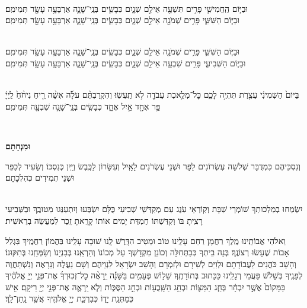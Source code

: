 \documentclass[twoside, openany, parskip=half, 11pt]{book}
\begin{document}
 \\
וּבַיּ֧וֹם הַֽחֲמִישִׁ֛י פָּרִ֥ים תִּשְׁעָ֖ה אֵילִ֣ם שְׁנָ֑יִם כְּבָשִׂ֧ים בְּנֵֽי־שָׁנָ֛ה אַרְבָּעָ֥ה עָשָׂ֖ר תְּמִימִֽם׃
\\
וּבַיּ֧וֹם הַשִּׁשִּׁ֛י פָּרִ֥ים שְׁמֹנָ֖ה אֵילִ֣ם שְׁנָ֑יִם כְּבָשִׂ֧ים בְּנֵֽי־שָׁנָ֛ה אַרְבָּעָ֥ה עָשָׂ֖ר תְּמִימִֽם׃



 \\
וּבַיּ֧וֹם הַשִּׁשִּׁ֛י פָּרִ֥ים שְׁמֹנָ֖ה אֵילִ֣ם שְׁנָ֑יִם כְּבָשִׂ֧ים בְּנֵֽי־שָׁנָ֛ה אַרְבָּעָ֥ה עָשָׂ֖ר תְּמִימִֽם׃
\\
וּבַיּ֧וֹם הַשְּׁבִיעִ֛י פָּרִ֥ים שִׁבְעָ֖ה אֵילִ֣ם שְׁנָ֑יִם כְּבָשִׂ֧ים בְּנֵֽי־שָׁנָ֛ה אַרְבָּעָ֥ה עָשָׂ֖ר תְּמִימִֽם׃



\\
בַּיּוֹם֙ הַשְּׁמִינִ֔י עֲצֶ֖רֶת תִּהְיֶ֣ה לָכֶ֑ם כׇּל־מְלֶ֥אכֶת עֲבֹדָ֖ה לֹ֥א תַֽעֲשֽׂוּ׃ וְהִקְרַבְתֶּ֨ם עֹלָ֜ה אִשֵּׁ֨ה רֵ֤יחַ נִיחֹ֨חַ֙ לַֽיְיָ֔ פַּ֥ר אֶחָ֖ד אַ֣יִל אֶחָ֑ד כְּבָשִׂ֧ים בְּנֵֽי־שָׁנָ֛ה שִׁבְעָ֖ה תְּמִימִֽם׃

\\ \label{uminchasam}
\begin{Large}\textbf{וּמִנְחָתָם}\end{Large}
וְנִסְכֵּיהֶם כִּמְדֻבָּר שְׁלֹשָׁה עֶשְׂרוֹנִים לַפָּר וּשְׁנֵי עֶשְׂרֹנִים לָאָֽיִל וְעִשָּׂרוֹן לַכֶּֽבֶשׂ וְיַֽיִן כְּנִסְכּוֹ׃ וְשָׂעִיר לְכַפֵּר וּשְׁנֵי תְמִידִים כְּהִלְכָתָם׃

\begin{sometimes}

\shabbos\\
יִשְׂמְחוּ בְמַלְכוּתְךָ שׁוֹמְרֵי שַׁבָּת וְקֽוֹרְאֵי עֹֽנֶג עַם מְקַדְּשֵׁי שְׁבִיעִי כֻּלָּם יִשְׂבְּעוּ וְיִתְעַנְּגוּ מִטּוּבֶֽךָ וּבַשְּׁבִיעִי רָצִֽיתָ בּוֹ וְקִדַּשְׁתּוֹ חֶמְדַּת יָמִים אוֹתוֹ קָרָֽאתָ זֵֽכֶר לְמַעֲשֵׂה בְרֵאשִׁית׃

\end{sometimes}

\enlargethispage{\baselineskip}
וֵאלֹהֵי אֲבוֹתֵֽינוּ מֶֽלֶךְ רַחֲמָן רַחֵם עָלֵֽינוּ טוֹב וּמֵטִיב הִדָּֽרֶשׁ לָֽנוּ שׁוּבָה עָלֵֽינוּ בַּהֲמוֹן רַחֲמֶֽיךָ בִּגְלַל אָבוֹת שֶׁעָשׂוּ רְצוֹנֶֽךָ׃ בְּנֵה בֵיתְךָ כְּבַתְּחִלָּה וְכוֹנֵן מִקְדָשְׁךָ עַל מְכוֹנוֹ וְהַרְאֵֽנוּ בְּבִנְיָנוֹ וְשַׂמְּחֵֽנוּ בְּתִקּוּנוֹ׃ וְהָשֵׁב כֹּהֲנִים לַעֲבוֹדָתָם וּלְוִיִּם לְשִׁירָם וּלְזִמְרָם וְהָשֵׁב יִשְׂרָאֵל לִנְוֵיהֶם׃ וְשָׁם נַעֲלֶה וְנֵרָאֶה וְנִשְׁתַּחֲוֶה לְפָנֶֽיךָ בְּשָׁלֹֹשׁ פַּעֲמֵי רְגָלֵֽינוּ כַּכָּתוּב בְּתוֹרָתֶֽךָ׃ שָׁל֣וֹשׁ פְּעָמִ֣ים בַּשָּׁנָ֡ה יֵֽרָאֶ֨ה כׇל־זְכֽוּרְךָ֜ אֶת־פְּנֵ֣י יְיָ֣ אֱלֹהֶ֗יךָ בַּמָּקוֹם֙ אֲשֶׁ֣ר יִבְחָ֔ר בְּחַ֧ג הַמַּצּ֛וֹת וּבְחַ֥ג הַשָּֽׁבֻע֖וֹת וּבְחַ֣ג הַסֻּכּ֑וֹת וְלֹ֧א יֵֽרָאֶ֛ה אֶת־פְּנֵ֥י יְיָ֖ רֵיקָֽם׃ אִ֖ישׁ כְּמַתְּנַֽת יָד֑וֹ כְּבִרְכַּ֛ת יְיָ֥ אֱלֹהֶ֖יךָ אֲשֶׁ֥ר נָֽתַן־לָֽךְ׃
\end{document}
